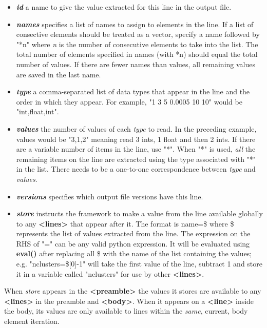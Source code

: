 \documentclass[paper=a4, fontsize=11pt]{scrartcl} %
\numberwithin{equation}{section} %
\numberwithin{figure}{section} %
\numberwithin{table}{section} %
\begin{document}
\begin{itemize}
\item \textbf{\textit{id}} a name to give the value extracted for this line in the output file.
\item \textbf{\textit{names}} specifies a list of names to assign to elements in the line.
If a list of consective elements should be treated as a vector, specify a name followed by "*n"
where \textit{n} is the number of consecutive elements to take into the list. The total number
of elements specified in names (with *n) should equal the total number of values. If there are
fewer names than values, all remaining values are saved in the last name.
\item \textbf{\textit{type}} a comma-separated list of data types that appear in the line and
the order in which they appear. For example, "1 3 5 0.0005 10 10" would be "int,float,int".
\item \textbf{\textit{values}} the number of values of each \textit{type} to read. In the
preceding example, values would be "3,1,2" meaning read 3 ints, 1 float and then 2 ints. If
there are a variable number of items in the line, use "*". When "*" is used, \textit{all} the
remaining items on the line are extracted using the type associated with "*" in the list.
There needs to be a one-to-one correspondence between \textit{type} and \textit{values}.
\item \textbf{\textit{versions}} specifies which output file versions have this line.
\item \textbf{\textit{store}} instructs the framework to make a value from the line available
globally to any \textbf{<lines>} that appear after it. The format is name=\$ where \$ represents
the list of values extracted from the line. The expression on the RHS of "=" can be any valid
python expression. It will be evaluated using \textbf{eval()} after replacing all \$ with the
name of the list containing the values; e.g. "nclusters=\$[0]-1" will take the first value
of the line, subtract 1 and store it in a variable called "nclusters" for use by other \textbf{<lines>}.
\end{itemize}

When \textit{store} appears in the \textbf{<preamble>} the values it stores are available to
any \textbf{<lines>} in the preamble and \textbf{<body>}. When it appears on a \textbf{<line>}
inside the body, its values are only available to lines within the \textit{same}, current,
body element iteration. \\
\end{document}
